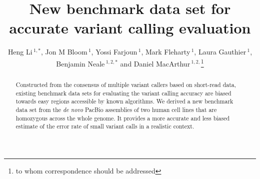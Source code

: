 \documentclass{bioinfo}
\begin{document}

\title[Evaluating small variant calling]{New benchmark data set for accurate variant calling evaluation}

\author[Li et al]{Heng Li\,$^{1,*}$, Jon M Bloom\,$^1$, Yossi Farjoun\,$^1$, Mark
  Fleharty\,$^1$, Laura Gauthier\,$^1$, Benjamin Neale\,$^{1,2,*}$ and Daniel
  MacArthur\,$^{1,2,}$\footnote{to whom correspondence should be addressed}}

\address{$^1$Broad Institute of Harvard and MIT, Cambridge, MA 02142, USA\\
$^2$Analytic and Translational Genetics Unit, Massachusetts General Hospital, Boston, MA 02114, USA}

\maketitle

\begin{abstract}

Constructed from the consensus of multiple variant callers based on short-read
data, existing benchmark data sets for evaluating the variant calling accuracy
are biased towards easy regions accessible by known algorithms.  We derived a
new benchmark data set from the \emph{de novo} PacBio assemblies of two human
cell lines that are homozygous across the whole genome. It provides a more
accurate and less biased estimate of the error rate of small variant calls in a
realistic context.

\end{abstract}
\end{document}
